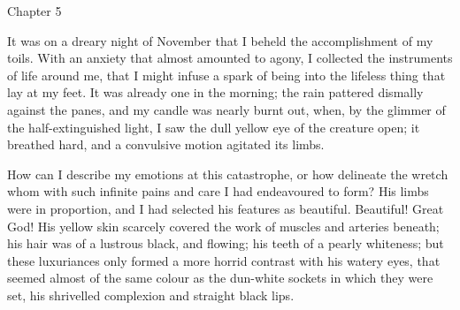 \documentclass[12pt,openright]{book}
\begin{document}
Chapter 5

It was on a dreary night of November that I beheld the accomplishment of my toils. With an anxiety that almost amounted to agony, I collected the instruments of life around me, that I might infuse a spark of being into the lifeless thing that lay at my feet. It was already one in the morning; the rain pattered dismally against the panes, and my candle was nearly burnt out, when, by the glimmer of the half-extinguished light, I saw the dull yellow eye of the creature open; it breathed hard, and a convulsive motion agitated its limbs.

How can I describe my emotions at this catastrophe, or how delineate the wretch whom with such infinite pains and care I had endeavoured to form? His limbs were in proportion, and I had selected his features as beautiful. Beautiful! Great God! His yellow skin scarcely covered the work of muscles and arteries beneath; his hair was of a lustrous black, and flowing; his teeth of a pearly whiteness; but these luxuriances only formed a more horrid contrast with his watery eyes, that seemed almost of the same colour as the dun-white sockets in which they were set, his shrivelled complexion and straight black lips.
\end{document}
